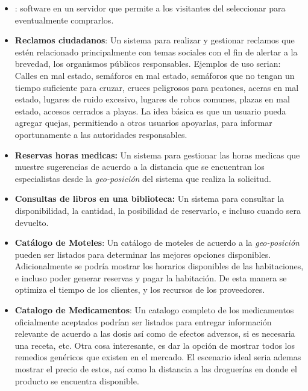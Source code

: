 \begin{itemize}
	\item \textbf{\shoppingCart}: \ecommerce software en un servidor \web que permite a los visitantes del \website seleccionar \itemsCommerce para eventualmente comprarlos.
	
	\item \textbf{Reclamos ciudadanos}: Un sistema para realizar y gestionar reclamos que estén relacionado principalmente con temas sociales con el fin de alertar a la brevedad, los organismos públicos responsables. Ejemplos de uso serian: Calles en mal estado, semáforos en mal estado, semáforos que no tengan un tiempo suficiente para cruzar, cruces peligrosos para peatones, aceras en mal estado, lugares de ruido excesivo, lugares de robos comunes, plazas en mal estado, accesos cerrados a playas. La idea básica es que un usuario pueda agregar quejas, permitiendo a otros usuarios apoyarlas, para informar oportunamente a las autoridades responsables.
	
	\item \textbf{Reservas horas medicas:} Un sistema para gestionar las horas medicas que muestre sugerencias de acuerdo a la distancia que se encuentran los especialistas desde la \textit{geo-posición} del sistema que realiza la solicitud. 
	
	\item \textbf{Consultas de libros en una biblioteca:} Un sistema para consultar la disponibilidad, la cantidad, la posibilidad de reservarlo, e incluso cuando sera devuelto.
	\item \textbf{Catálogo de Moteles}: Un catálogo de moteles de acuerdo a la \textit{geo-posición} pueden ser listados para determinar las mejores opciones disponibles. Adicionalmente se podría mostrar los horarios disponibles de las habitaciones, e incluso poder generar reservas y pagar la habitación. De esta manera se optimiza el tiempo de los clientes, y los recursos de los proveedores.
	
	\item \textbf{Catalogo de Medicamentos}: Un catalogo completo de los medicamentos oficialmente aceptados podrían ser listados para entregar información relevante de acuerdo a las dosis así como de efectos adversos, si es necesaria una receta, etc. Otra cosa interesante, es dar la opción de mostrar todos los remedios genéricos que existen en el mercado. El escenario ideal seria ademas mostrar el precio de estos, así como la distancia a las droguerías en donde el producto se encuentra disponible.
	

\end{itemize}
